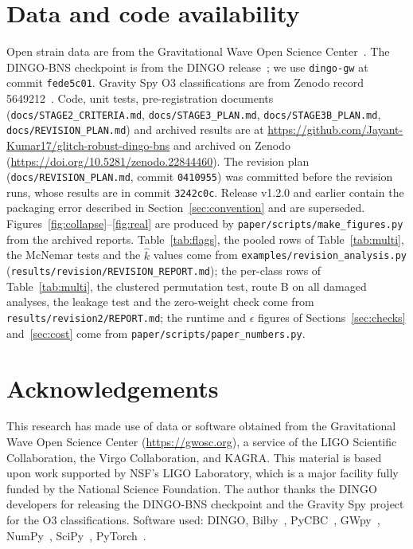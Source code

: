 \documentclass{openjournal}
\newcommand{\DINGOBNS}{DINGO-BNS\xspace}
\begin{document}
\section*{Data and code availability}
Open strain data are from the Gravitational Wave Open Science Center~\cite{Abbott2021opendata,Abbott2023opendata}.
The \DINGOBNS checkpoint is from the DINGO release~\cite{Dax2025bns}; we use \texttt{dingo-gw} at commit \texttt{fede5c01}.
Gravity Spy O3 classifications are from Zenodo record 5649212~\cite{Glanzer2023gravityspy}.
Code, unit tests, pre-registration documents (\texttt{docs/STAGE2\_CRITERIA.md}, \texttt{docs/STAGE3\_PLAN.md}, \texttt{docs/STAGE3B\_PLAN.md}, \texttt{docs/REVISION\_PLAN.md}) and archived results are at \url{https://github.com/Jayant-Kumar17/glitch-robust-dingo-bns} and archived on Zenodo (\url{https://doi.org/10.5281/zenodo.22844460}).
The revision plan (\texttt{docs/REVISION\_PLAN.md}, commit \texttt{0410955}) was committed before the revision runs, whose results are in commit \texttt{3242c0c}.
Release v1.2.0 and earlier contain the packaging error described in Section~\ref{sec:convention} and are superseded.
Figures~\ref{fig:collapse}--\ref{fig:real} are produced by \texttt{paper/scripts/make\_figures.py} from the archived reports.
Table~\ref{tab:flags}, the pooled rows of Table~\ref{tab:multi}, the McNemar tests and the $\hat k$ values come from \texttt{examples/revision\_analysis.py} (\texttt{results/revision/REVISION\_REPORT.md}); the per-class rows of Table~\ref{tab:multi}, the clustered permutation test, route B on all damaged analyses, the leakage test and the zero-weight check come from \texttt{results/revision2/REPORT.md}; the runtime and $\epsilon$ figures of Sections~\ref{sec:checks} and~\ref{sec:cost} come from \texttt{paper/scripts/paper\_numbers.py}.


\section*{Acknowledgements}
This research has made use of data or software obtained from the Gravitational Wave Open Science Center (\url{https://gwosc.org}), a service of the LIGO Scientific Collaboration, the Virgo Collaboration, and KAGRA.
This material is based upon work supported by NSF's LIGO Laboratory, which is a major facility fully funded by the National Science Foundation.
The author thanks the DINGO developers for releasing the \DINGOBNS checkpoint and the Gravity Spy project for the O3 classifications.
Software used: DINGO, Bilby~\cite{Ashton2019bilby}, PyCBC~\cite{Usman2016pycbc}, GWpy~\cite{Macleod2021gwpy}, NumPy~\cite{Harris2020numpy}, SciPy~\cite{Virtanen2020scipy}, PyTorch~\cite{Paszke2019pytorch}.
\end{document}
